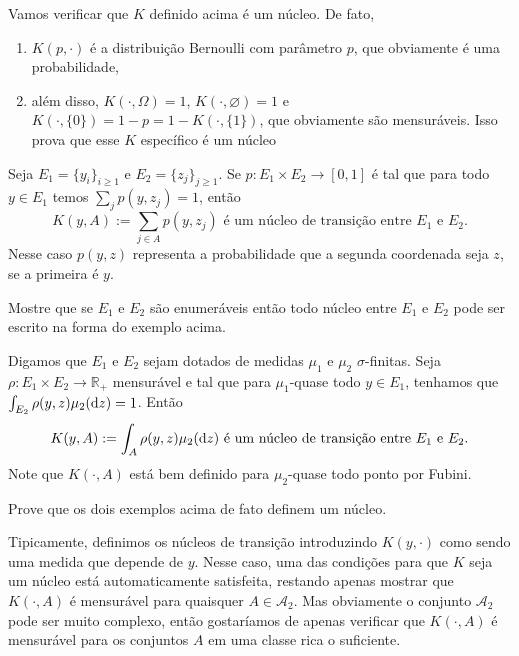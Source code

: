 Vamos verificar que $K$ definido acima é um núcleo.
De fato,
\begin{enumerate}[\quad i)]
\item $K(p, \cdot)$ é a distribuição Bernoulli com parâmetro $p$, que obviamente é uma probabilidade,
\item além disso, $K(\cdot, \Omega) = 1$, $K(\cdot, \varnothing) = 1$ e $K(\cdot, \{0\}) = 1-p = 1 - K(\cdot,\{1\})$, que obviamente são mensuráveis.
Isso prova que esse $K$ específico é um núcleo
\end{enumerate}

\begin{example}[Discreto]
  \label{x:nucleo_discreto}
  Seja $E_1 = \{y_i\}_{i \geq 1}$ e $E_2 = \{z_j\}_{j \geq 1}$.
  Se $p: E_1 \times E_2 \to [0,1]$ é tal que para todo $y \in E_1$ temos $\sum_{j} p(y, z_j) = 1$, então
  \begin{equation}
    K(y, A) := \sum_{j \in A} p(y, z_j) \text{ é um núcleo de transição entre $E_1$ e $E_2$.}
  \end{equation}
  Nesse caso $p(y,z)$ representa a probabilidade que a segunda coordenada seja $z$, se a primeira é $y$.
\end{example}

\begin{exercise}
  Mostre que se $E_1$ e $E_2$ são enumeráveis então todo núcleo entre $E_1$ e $E_2$ pode ser escrito na forma do exemplo acima.
\end{exercise}

\begin{example}
  Digamos que $E_1$ e $E_2$ sejam dotados de medidas $\mu_1$ e $\mu_2$ $\sigma$-finitas.
  Seja $\rho: E_1 \times E_2 \to \mathbb{R}_+$ mensurável e tal que para $\mu_1$-quase todo $y \in E_1$, tenhamos que $\int_{E_2} \rho(y, z) \mu_2(\mathop{}\!\mathrm{d} z) = 1$.
  Então
  \begin{equation}
    K(y, A) := \int_A \rho(y, z) \mu_2(\mathop{}\!\mathrm{d} z) \text{ é um núcleo de transição entre $E_1$ e $E_2$.}
  \end{equation}
  Note que $K(\cdot, A)$ está bem definido para $\mu_2$-quase todo ponto por Fubini.
\end{example}

\begin{exercise}
  Prove que os dois exemplos acima de fato definem um núcleo.
\end{exercise}

Tipicamente, definimos os núcleos de transição introduzindo $K(y, \cdot)$ como sendo uma medida que depende de $y$.
Nesse caso, uma das condições para que $K$ seja um núcleo está automaticamente satisfeita, restando apenas mostrar que $K(\cdot, A)$ é mensurável para quaisquer $A \in \mathcal{A}_2$.
Mas obviamente o conjunto $\mathcal{A}_2$ pode ser muito complexo, então gostaríamos de apenas verificar que $K(\cdot, A)$ é mensurável para os conjuntos $A$ em uma classe rica o suficiente.

